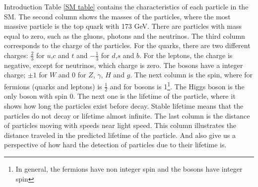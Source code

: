 \begin{chapter}{Introduction}
Table \ref{SM table} contains the characteristics of each particle in the SM. The second column shows the masses of the particles, where the most massive particle is the top quark with 173 GeV. There are particles with mass equal to zero, such as the gluons, photons and the neutrinos. 
The third column corresponds to the charge of the particles. For the quarks, there are two different charges: $\frac{2}{3}$ for $u$,$c$ and $t$ and $-\frac{1}{3}$ for $d$,$s$ and $b$. For the leptons, the charge is negative, except for neutrinos, which charge is zero. 
The bosons have a integer charge; $\pm 1$ for $W$ and 0 for $Z$, $\gamma$, $H$ and $g$.	
The next column is the spin, where for fermions (quarks and leptons) is $\frac{1}{2}$ and for bosons is 1\footnote{In general, the fermions have non integer spin and the bosons have integer spin}. The Higgs boson is the only boson with spin 0.
The next one is the lifetime of the particle, where it shows how long the particles exist before decay. Stable lifetime means that the particles do not decay or lifetime almost infinite.
The last column is the distance of particles moving with speeds near light speed. This column illustrates the distance traveled in the predicted lifetime of the particle. And also give us a perspective of how hard the detection of  particles due to their lifetime is.  


\end{chapter}
